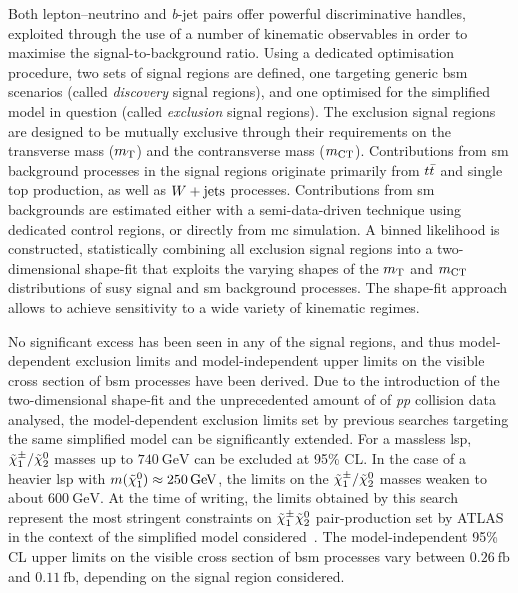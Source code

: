 Both lepton--neutrino and \textit{b}-jet pairs offer powerful discriminative handles, exploited through the use of a number of kinematic observables in order to maximise the signal-to-background ratio.
Using a dedicated optimisation procedure, two sets of signal regions are defined, one targeting generic \gls{bsm} scenarios (called \textit{discovery} signal regions), and one optimised for the simplified model in question (called \textit{exclusion} signal regions). 
The exclusion signal regions are designed to be mutually exclusive through their requirements on the transverse mass ($m_{\textrm{T}}$) and the contransverse mass ($m_{\textrm{CT}}$).
Contributions from \gls{sm} background processes in the signal regions originate primarily from $t\bar{t}$ and single top production, as well as $W+\mathrm{jets}$ processes. Contributions from \gls{sm} backgrounds are estimated either with a semi-data-driven technique using dedicated control regions, or directly from \gls{mc} simulation.
A binned likelihood is constructed, statistically combining all exclusion signal regions into a two-dimensional shape-fit that exploits the varying shapes of the $m_{\textrm{T}}$ and $m_{\textrm{CT}}$ distributions of \gls{susy} signal and \gls{sm} background processes. The shape-fit approach allows to achieve sensitivity to a wide variety of kinematic regimes.

No significant excess has been seen in any of the signal regions, and thus model-dependent exclusion limits and model-independent upper limits on the visible cross section of \gls{bsm} processes have been derived.
Due to the introduction of the two-dimensional shape-fit and the unprecedented amount of \onethirtynineifb of \textit{pp} collision data analysed, the model-dependent exclusion limits set by previous searches targeting the same simplified model can be significantly extended.
For a massless \gls{lsp}, $\tilde{\chi}_1^\pm/\tilde{\chi}_2^0$ masses up to $\SI{740}{\GeV}$ can be excluded at 95\% CL. In the case of a heavier \gls{lsp} with $m(\lsp)\approx\SI{250}{\GeV}$, the limits on the $\tilde{\chi}_1^\pm/\tilde{\chi}_2^0$ masses weaken to about $\SI{600}{\GeV}$.
At the time of writing, the limits obtained by this search represent the most stringent constraints on $\tilde{\chi}_1^\pm\tilde{\chi}_2^0$ pair-production set by ATLAS in the context of the simplified model considered~\cite{ATL-PHYS-PUB-2020-020}.
The model-independent 95\% CL upper limits on the visible cross section of \gls{bsm} processes vary between $\SI{0.26}{\femto\barn}$ and $\SI{0.11}{\femto\barn}$, depending on the signal region considered. 

